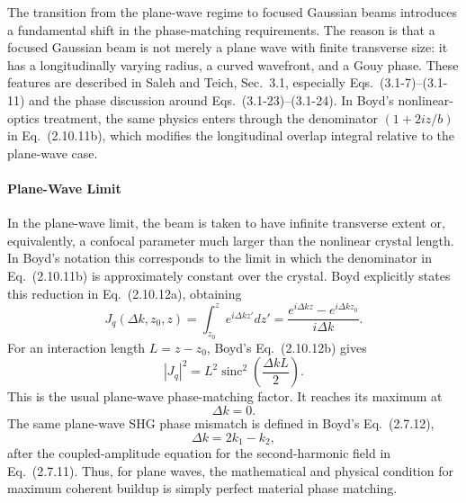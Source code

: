 \begin{resolucao}[Solution]
    The transition from the plane-wave regime to focused Gaussian beams introduces a fundamental shift in the phase-matching requirements. The reason is that a focused Gaussian beam is not merely a plane wave with finite transverse size: it has a longitudinally varying radius, a curved wavefront, and a Gouy phase. These features are described in Saleh and Teich, Sec.~3.1, especially Eqs.~(3.1-7)--(3.1-11) and the phase discussion around Eqs.~(3.1-23)--(3.1-24). In Boyd's nonlinear-optics treatment, the same physics enters through the denominator $(1+2iz/b)$ in Eq.~(2.10.11b), which modifies the longitudinal overlap integral relative to the plane-wave case.

    \paragraph*{Plane-Wave Limit}
        In the plane-wave limit, the beam is taken to have infinite transverse extent or, equivalently, a confocal parameter much larger than the nonlinear crystal length. In Boyd's notation this corresponds to the limit in which the denominator in Eq.~(2.10.11b) is approximately constant over the crystal. Boyd explicitly states this reduction in Eq.~(2.10.12a), obtaining
        \begin{equation}
            J_q(\Delta k,z_0,z)
            =
            \int_{z_0}^{z}
            e^{i\Delta k z'}dz'
            =
            \frac{
            e^{i\Delta k z}-e^{i\Delta k z_0}
            }{
            i\Delta k
            }.
            \label{eq:plane_wave_overlap}
        \end{equation}
        For an interaction length $L=z-z_0$, Boyd's Eq.~(2.10.12b) gives
        \begin{equation}
            |J_q|^2
            =
            L^2
            \operatorname{sinc}^2
            \left(
            \frac{\Delta k L}{2}
            \right).
            \label{eq:sinc_plane_wave}
        \end{equation}
        This is the usual plane-wave phase-matching factor. It reaches its maximum at
        \begin{equation}
            \Delta k=0.
        \end{equation}
        The same plane-wave SHG phase mismatch is defined in Boyd's Eq.~(2.7.12),
        \begin{equation}
            \Delta k = 2k_1-k_2,
        \end{equation}
        after the coupled-amplitude equation for the second-harmonic field in Eq.~(2.7.11). Thus, for plane waves, the mathematical and physical condition for maximum coherent buildup is simply perfect material phase matching.


\end{resolucao}
